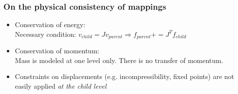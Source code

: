 \documentclass[a4paper,compress]{beamer}
\begin{document}
\begin{frame}
\begin{columns}
\end{columns}

\end{frame}

\begin{frame}
\frametitle{On the physical consistency of mappings}
\begin{itemize}
 \item Conservation of energy:\\Necessary condition: $v_{child} = Jv_{parent} \Rightarrow f_{parent} += J^T f_{child}$
 \item Conservation of momentum:\\
 Mass is modeled at one level only. There is no transfer of momentum.
 \item Constraints on displacements (e.g. incompressibility, fixed points) are not easily applied \textit{at the child level}
\end{itemize}

\end{frame}
\end{document}
